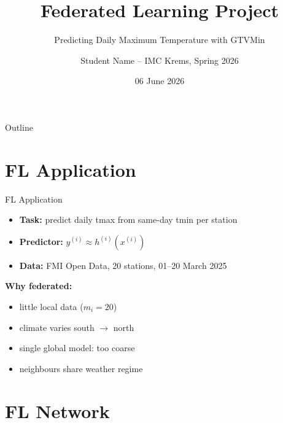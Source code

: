 \documentclass[12pt]{beamer}
\title{Federated Learning Project}
\subtitle{\Huge Predicting Daily Maximum Temperature with GTVMin}
\author{Student Name -- IMC Krems, Spring 2026}
\date{06 June 2026}
\newcommand{\nodeidx}{i}
\newcommand{\truelabel}{y}
\begin{document}
\begin{frame}
    \titlepage
\end{frame}

\begin{frame}{Outline}
    \tableofcontents
\end{frame}


\section{FL Application}

\begin{frame}{FL Application}
\begin{itemize}\setlength{\itemsep}{4mm}
    \item \textbf{Task:} predict daily tmax from same-day tmin per station
    \item \textbf{Predictor:} $\truelabel^{(\nodeidx)} \approx h^{(\nodeidx)}(x^{(\nodeidx)})$
    \item \textbf{Data:} FMI Open Data, 20 stations, 01--20 March 2025
\end{itemize}

\vspace{4mm}
\textbf{Why federated:}
\begin{itemize}\setlength{\itemsep}{2mm}
    \item little local data ($m_{\nodeidx} = 20$)
    \item climate varies south $\to$ north
    \item single global model: too coarse
    \item neighbours share weather regime
\end{itemize}
\end{frame}


\section{FL Network}
\end{document}
